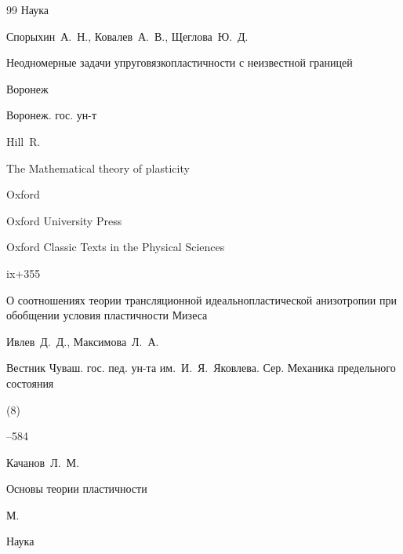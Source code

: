 \begin{thebibliography}{99}
\publ Наука






\by Спорыхин~А.~Н., Ковалев~А.~В., Щеглова~Ю.~Д.

\book Неодномерные задачи упруговязкопластичности с неизвестной границей

\publaddr Воронеж

\publ Воронеж. гос. ун-т






\by Hill~R.

\book The Mathematical theory of plasticity

\publaddr Oxford

\publ Oxford University Press

\serial Oxford Classic Texts in the Physical Sciences


\totalpages ix+355







\paper О соотношениях теории трансляционной идеальнопластической анизотропии при обобщении условия пластичности Мизеса

\by Ивлев~Д.~Д., Максимова~Л.~А.

\jour Вестник Чуваш. гос. пед. ун-та им.~И.~Я.~Яковлева. Сер. Механика предельного состояния


(8)

--584







\by Качанов~Л.~М.

\book Основы теории пластичности

\publaddr М.

\publ Наука








\end{thebibliography}
